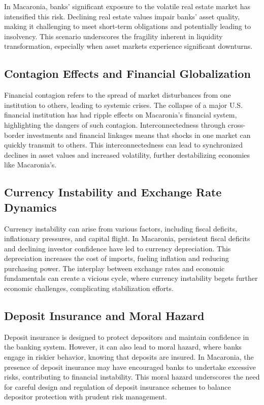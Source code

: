 In Macaronia, banks' significant exposure to the volatile real estate market has intensified this risk. Declining real estate values impair banks' asset quality, making it challenging to meet short-term obligations and potentially leading to insolvency. This scenario underscores the fragility inherent in liquidity transformation, especially when asset markets experience significant downturns.

\subsection{Contagion Effects and Financial Globalization}

Financial contagion refers to the spread of market disturbances from one institution to others, leading to systemic crises. The collapse of a major U.S. financial institution has had ripple effects on Macaronia's financial system, highlighting the dangers of such contagion. Interconnectedness through cross-border investments and financial linkages means that shocks in one market can quickly transmit to others. This interconnectedness can lead to synchronized declines in asset values and increased volatility, further destabilizing economies like Macaronia's.

\subsection{Currency Instability and Exchange Rate Dynamics}

Currency instability can arise from various factors, including fiscal deficits, inflationary pressures, and capital flight. In Macaronia, persistent fiscal deficits and declining investor confidence have led to currency depreciation. This depreciation increases the cost of imports, fueling inflation and reducing purchasing power. The interplay between exchange rates and economic fundamentals can create a vicious cycle, where currency instability begets further economic challenges, complicating stabilization efforts.

\subsection{Deposit Insurance and Moral Hazard}

Deposit insurance is designed to protect depositors and maintain confidence in the banking system. However, it can also lead to moral hazard, where banks engage in riskier behavior, knowing that deposits are insured. In Macaronia, the presence of deposit insurance may have encouraged banks to undertake excessive risks, contributing to financial instability. This moral hazard underscores the need for careful design and regulation of deposit insurance schemes to balance depositor protection with prudent risk management.
